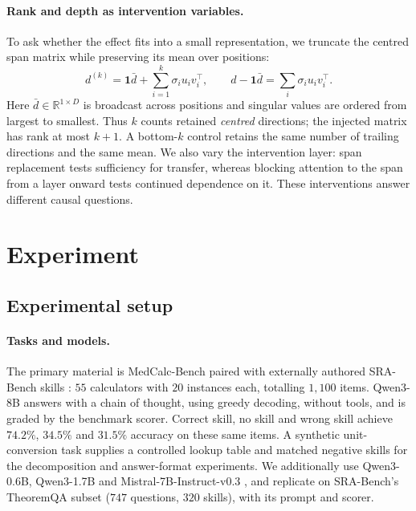 \documentclass{article}
\newcommand{\dvec}{\ensuremath{d}}
\begin{document}
\paragraph{Rank and depth as intervention variables.}
To ask whether the effect fits into a small representation, we truncate the
centred span matrix while preserving its mean over positions:
\begin{equation}
\dvec^{(k)}=\mathbf{1}\bar{\dvec}+\sum_{i=1}^{k}\sigma_i u_i v_i^\top,
\qquad
\dvec-\mathbf{1}\bar{\dvec}=\sum_i\sigma_i u_i v_i^\top.
\label{eq:rank}
\end{equation}
Here $\bar{\dvec}\in\mathbb{R}^{1\times D}$ is broadcast across positions and
singular values are ordered from largest to smallest. Thus $k$ counts retained
\emph{centred} directions; the injected matrix has rank at most $k+1$. A
bottom-$k$ control retains the same number of trailing directions and the same
mean. We also vary the intervention layer: span replacement tests sufficiency
for transfer, whereas blocking attention to the span from a layer onward tests
continued dependence on it. These interventions answer different causal
questions.

\section{Experiment}
\label{sec:experiments}

\subsection{Experimental setup}
\label{sec:setup}
\label{sec:cells}

\paragraph{Tasks and models.}
The primary material is MedCalc-Bench \citep{khandekar2024medcalc} paired with
externally authored SRA-Bench skills \citep{su2026srabench}: $55$ calculators
with $20$ instances each, totalling $1{,}100$ items. Qwen3-8B
\citep{yang2025qwen3} answers with a chain of thought, using greedy decoding,
without tools, and is graded by the benchmark scorer. Correct skill, no skill
and wrong skill achieve $74.2\%$, $34.5\%$ and $31.5\%$ accuracy on these same
items. A synthetic unit-conversion task supplies a controlled lookup table and
matched negative skills for the decomposition and answer-format experiments.
We additionally use Qwen3-0.6B, Qwen3-1.7B and Mistral-7B-Instruct-v0.3
\citep{jiang2023mistral}, and replicate on SRA-Bench's TheoremQA subset
($747$ questions, $320$ skills), with its prompt and scorer.
\end{document}

